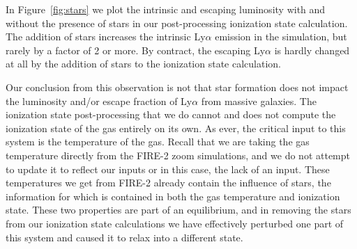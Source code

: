 In Figure~\ref{fig:stars} we plot the intrinsic and escaping luminosity with and without the presence of stars in our post-processing ionization state calculation.
The addition of stars increases the intrinsic Ly$\alpha$ emission in the simulation, but rarely by a factor of 2 or more.
By contract, the escaping Ly$\alpha$ is hardly changed at all by the addition of stars to the ionization state calculation.

Our conclusion from this observation is not that star formation does not impact the luminosity and/or escape fraction of Ly$\alpha$ from massive galaxies.
The ionization state post-processing that we do cannot and does not compute the ionization state of the gas entirely on its own.
As ever, the critical input to this system is the temperature of the gas.
Recall that we are taking the gas temperature directly from the FIRE-2 zoom simulations, and we do not attempt to update it to reflect our inputs or in this case, the lack of an input.
These temperatures we get from FIRE-2 already contain the influence of stars, the information for which is contained in both the gas temperature and ionization state.
These two properties are part of an equilibrium, and in removing the stars from our ionization state calculations we have effectively perturbed one part of this system and caused it to relax into a different state.

